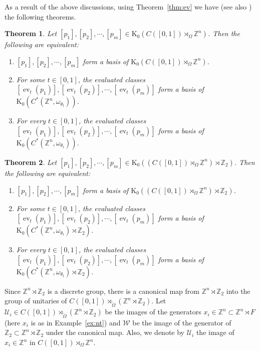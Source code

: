 \documentclass[9pt, BCOR=2mm]{amsart}
\numberwithin{equation}{section}
\numberwithin{equation}{section}
\newtheorem{theorem}{Theorem}[section]
\newcommand{\Z}{{\mathbb{Z}}}
\newcommand{\K}{\mathrm{K}} %
\DeclareMathOperator{\ev}{ev}
\begin{document}
	
As a result of the above discussions, using Theorem~\ref{thm:ev} we have (see also \cite[Remark 2.3]{ELPW10}) the following theorems.   
\begin{theorem}\label{thm:elpw_gen_nt}
Let $[p_1],[p_2],\cdots , [p_m] \in \K_0(C([0,1])\rtimes_{ \Omega} \Z^n)$. 
	Then the following are equivalent:
	
	\begin{enumerate}
		\item $[p_1],[p_2],\cdots , [p_m]$ form a basis of $\K_0(C([0,1])\rtimes_{ \Omega} \Z^n )$.  
		\item For some $t \in [0,1]$, the evaluated classes $[\ev_t(p_1)],[\ev_t(p_2)], \cdots ,[\ev_t(p_m)]$ form a basis of $\K_0(C^*(\Z^n,\omega_{\theta_t}))$. 
	  \item For every $t \in [0,1]$, the evaluated classes $[\ev_t(p_1)],[\ev_t(p_2)], \cdots , [\ev_t(p_m)]$ form a basis of $\K_0(C^*(\Z^n,\omega_{\theta_t}))$. 
\end{enumerate}
\end{theorem}

\begin{theorem}\label{thm:elpw_gen}
\label{elpwmain}Let $[p_1],[p_2],\cdots , [p_m] \in \K_0((C([0,1])\rtimes_{ \Omega} \Z^n    )\rtimes \Z_2)$. 
	Then the following are equivalent:
	
	\begin{enumerate}
		\item $[p_1],[p_2],\cdots , [p_m]$ form a basis of $\K_0((C([0,1])\rtimes_{ \Omega} \Z^n    )\rtimes \Z_2)$.  
		\item For some $t \in [0,1]$, the evaluated classes $[\ev_t(p_1)],[\ev_t(p_2)], \cdots ,[\ev_t(p_m)]$ form a basis of $\K_0(C^*(\Z^n,\omega_{\theta_t})\rtimes \Z_2)$. 
	  \item For every $t \in [0,1]$, the evaluated classes $[\ev_t(p_1)],[\ev_t(p_2)], \cdots , [\ev_t(p_m)]$ form a basis of $\K_0(C^*(\Z^n,\omega_{\theta_t})\rtimes \Z_2)$. 
\end{enumerate}
\end{theorem}

 Since $\mathbb{Z}^{n} \rtimes \Z_2$ is a discrete group, there is a canonical map from $\mathbb{Z}^{n} \rtimes \Z_2$ into the group of unitaries of $C([0,1])\rtimes_{ \widetilde{\Omega}} (\Z^n \rtimes \Z_2)$. Let $\mathcal{U}_{i} \in C([0,1])\rtimes_{ \widetilde{\Omega}} (\Z^n \rtimes \Z_2)$ be the images of the generators $x_i \in \mathbb{Z}^{n}\subset \mathbb{Z}^{n} \rtimes F$ (here $x_i$ is as in Example~\ref{ex:nt}) and $\mathcal{W}$ be the image of the generator of $\Z_2 \subset \mathbb{Z}^{n} \rtimes \Z_2$ under the canonical map. Also, we denote by $\mathcal{U}_{i}$ the image of $x_i \in \mathbb{Z}^{n}$ in $C([0,1])\rtimes_{ \Omega} \Z^n.$
 
\end{document}
